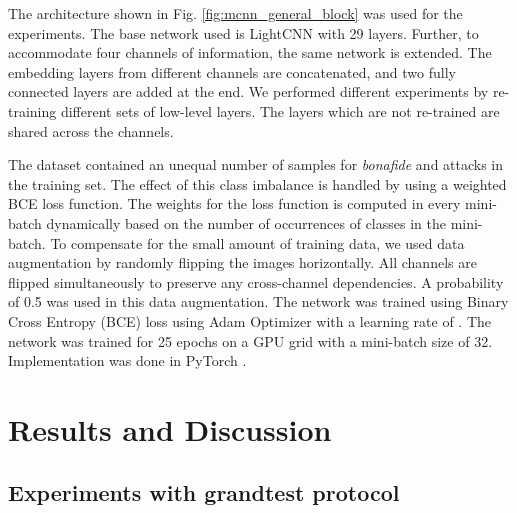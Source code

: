 \documentclass[journal]{IEEEtran}
\begin{document}
The architecture shown in Fig. \ref{fig:mcnn_general_block} was used for the experiments. The base network used is LightCNN with 29 layers. Further, to accommodate four channels of information, the same network is extended. The embedding layers from different channels are concatenated, and two fully connected layers are added at the end. We performed different experiments by re-training different sets of low-level layers. The layers which are not re-trained are shared across the channels.

The dataset contained an unequal number of samples for \textit{bonafide} and attacks in the training set. The effect of this class imbalance is handled by using a weighted BCE loss function. The weights for the loss function is computed in every mini-batch dynamically based on the number of occurrences of classes in the mini-batch. To compensate for the small amount of training data, we used data augmentation by randomly flipping the images horizontally. All channels are flipped simultaneously to preserve any cross-channel dependencies. A probability of 0.5 was used in this data augmentation. The network was trained using Binary Cross Entropy (BCE) loss using Adam Optimizer \cite{kingma2014adam} with a learning rate of . The network was trained for 25 epochs on a GPU grid with a mini-batch size of 32. Implementation was done in PyTorch \cite{paszke2017automatic}.

\section{Results and Discussion}



\subsection{Experiments with \textbf{grandtest} protocol}
\end{document}

